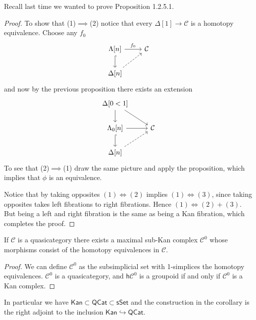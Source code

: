 \documentclass{amsart}
\begin{document}
Recall last time we wanted to prove Proposition 1.2.5.1.
\begin{proof}
    To show that (1)$\implies$(2) notice that every $\Delta[1]\to\mathcal{C}$ is a homotopy equivalence.
    Choose any $f_0$
    \begin{equation*}
        \begin{tikzcd}
            \Lambda[n] \rar{f_0}\dar[hook] & \mathcal{C} \\
            \Delta[n]\ar[ur, dashed] 
        \end{tikzcd}
    \end{equation*}
    and now by the previous proposition there exists an extension
    \begin{equation*}
        \begin{tikzcd}
            \Delta[0<1] \ar{rd}\dar \\
            \Lambda_0[n] \rar\dar[hook] & \mathcal{C} \\
            \Delta[n]\ar[ur,dashed]{f}
        \end{tikzcd}
    \end{equation*}
    To see that (2)$\implies$(1) draw the same picture and apply the proposition,
    which implies that $\phi$ is an equivalence.

    Notice that by taking opposites $(1)\iff(2)$ implies $(1)\iff(3)$, since taking
    opposites takes left fibrations to right fibrations. Hence $(1)\iff (2)+(3)$.
    But being a left and right fibration is the same as being a Kan fibration, which
    completes the proof.
\end{proof}

\begin{corollary}
    If $\mathcal{C}$ is a quasicategory there exists a maximal sub-Kan complex
    $\mathcal{C}^0$ whose morphisms consist of the homotopy equivalences in $\mathcal{C}$.
\end{corollary}
\begin{proof}
    We can define $\mathcal{C}^0$ as the subsimplicial set with 1-simplices
    the homotopy equivalences. $\mathcal{C}^0$ is a quasicategory, and $\mathsf{h}\mathcal{C}^0$
    is a groupoid if and only if $\mathcal{C}^0$ is a Kan complex.
\end{proof}
In particular we have $\mathsf{Kan}\subset \mathsf{QCat}\subset\mathsf{sSet}$
and the construction in the corollary is the right adjoint to the inclusion
$\mathsf{Kan}\hookrightarrow\mathsf{QCat}$.
\end{document}
